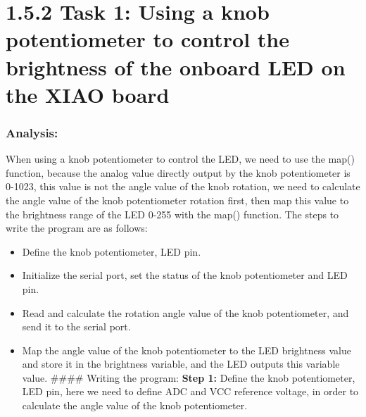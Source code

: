 \documentclass[
  letterpaper,
  DIV=11,
  numbers=noendperiod]{scrreprt}
\providecommand{\tightlist}{%
  \setlength{\itemsep}{0pt}\setlength{\parskip}{0pt}}\usepackage{longtable,booktabs,array}
\begin{document}
\hypertarget{task-1-using-a-knob-potentiometer-to-control-the-brightness-of-the-onboard-led-on-the-xiao-board}{%
\section*{1.5.2 Task 1: Using a knob potentiometer to control the
brightness of the onboard LED on the XIAO
board}\label{task-1-using-a-knob-potentiometer-to-control-the-brightness-of-the-onboard-led-on-the-xiao-board}}


\hypertarget{analysis}{%
\subsubsection*{Analysis:}\label{analysis}}

When using a knob potentiometer to control the LED, we need to use the
map() function, because the analog value directly output by the knob
potentiometer is 0-1023, this value is not the angle value of the knob
rotation, we need to calculate the angle value of the knob potentiometer
rotation first, then map this value to the brightness range of the LED
0-255 with the map() function. The steps to write the program are as
follows:

\begin{itemize}
\tightlist
\item
  Define the knob potentiometer, LED pin.
\item
  Initialize the serial port, set the status of the knob potentiometer
  and LED pin.
\item
  Read and calculate the rotation angle value of the knob potentiometer,
  and send it to the serial port.
\item
  Map the angle value of the knob potentiometer to the LED brightness
  value and store it in the brightness variable, and the LED outputs
  this variable value. \#\#\#\# Writing the program: \textbf{Step 1:}
  Define the knob potentiometer, LED pin, here we need to define ADC and
  VCC reference voltage, in order to calculate the angle value of the
  knob potentiometer.
\end{itemize}
\end{document}
